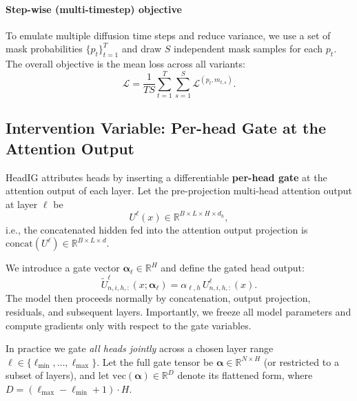 \paragraph*{Step-wise (multi-timestep) objective}
\label{sec:method:multi_timestep}

To emulate multiple diffusion time steps and reduce variance, we use a set of mask probabilities $\{p_t\}_{t=1}^{T}$ and draw $S$ independent mask samples for each $p_t$. The overall objective is the mean loss across all variants:
\begin{equation}
\mathcal{L} = \frac{1}{TS}\sum_{t=1}^{T}\sum_{s=1}^{S} \mathcal{L}^{(p_t, m_{t,s})}.
\label{eq:overall_loss}
\end{equation}

\subsection{Intervention Variable: Per-head Gate at the Attention Output}
\label{sec:method:gate}

HeadIG attributes heads by inserting a differentiable \textbf{per-head gate} at the attention output of each layer. Let the pre-projection multi-head attention output at layer $\ell$ be
\begin{equation}
U^\ell(x) \in \mathbb{R}^{B \times L \times H \times d_h},
\end{equation}
i.e., the concatenated hidden fed into the attention output projection is $\mathrm{concat}(U^\ell) \in \mathbb{R}^{B \times L \times d}$.

We introduce a gate vector $\boldsymbol{\alpha}_\ell \in \mathbb{R}^{H}$ and define the gated head output:
\begin{equation}
\tilde{U}^\ell_{n,i,h,:}(x;\boldsymbol{\alpha}_\ell) = \alpha_{\ell,h}\, U^\ell_{n,i,h,:}(x).
\label{eq:gate_def}
\end{equation}
The model then proceeds normally by concatenation, output projection, residuals, and subsequent layers. Importantly, we freeze all model parameters and compute gradients only with respect to the gate variables.

In practice we gate \emph{all heads jointly} across a chosen layer range $\ell \in \{\ell_{\min},\dots,\ell_{\max}\}$. Let the full gate tensor be $\boldsymbol{\alpha} \in \mathbb{R}^{N \times H}$ (or restricted to a subset of layers), and let $\mathrm{vec}(\boldsymbol{\alpha}) \in \mathbb{R}^{D}$ denote its flattened form, where $D = (\ell_{\max}-\ell_{\min}+1)\cdot H$.

